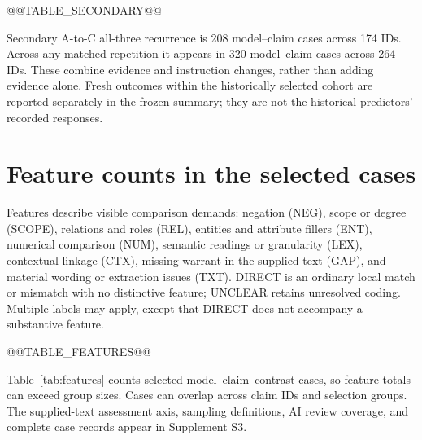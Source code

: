 \documentclass[11pt,letterpaper]{article}
\begin{document}
@@TABLE_SECONDARY@@

Secondary A-to-C all-three recurrence is 208 model--claim cases across 174 IDs. Across any matched repetition it appears in 320 model--claim cases across 264 IDs. These combine evidence and instruction changes, rather than adding evidence alone. Fresh outcomes within the historically selected cohort are reported separately in the frozen summary; they are not the historical predictors' recorded responses.

\section{Feature counts in the selected cases}\label{app:taxonomy}
Features describe visible comparison demands: negation (NEG), scope or degree (SCOPE), relations and roles (REL), entities and attribute fillers (ENT), numerical comparison (NUM), semantic readings or granularity (LEX), contextual linkage (CTX), missing warrant in the supplied text (GAP), and material wording or extraction issues (TXT). DIRECT is an ordinary local match or mismatch with no distinctive feature; UNCLEAR retains unresolved coding. Multiple labels may apply, except that DIRECT does not accompany a substantive feature.

@@TABLE_FEATURES@@

Table~\ref{tab:features} counts selected model--claim--contrast cases, so feature totals can exceed group sizes. Cases can overlap across claim IDs and selection groups. The supplied-text assessment axis, sampling definitions, AI review coverage, and complete case records appear in Supplement S3.
\end{document}
